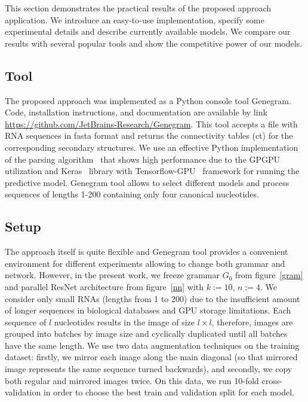 This section demonstrates the practical results of the proposed approach application. We introduce an easy-to-use implementation, specify some experimental details and describe currently available models. We compare our results with several popular tools and show the competitive power of our models.

\subsection{Tool}
The proposed approach was implemented as a Python console tool Genegram. Code, installation instructions, and documentation are available by link \linebreak \url{https://github.com/JetBrains-Research/Genegram}. This tool accepts a file with RNA sequences in fasta format and returns the connectivity tables (ct) for the corresponding secondary structures. We use an effective Python implementation of the parsing algorithm~\cite{Azimov:2018:CPQ:3210259.3210264} that shows high performance due to the GPGPU utilization and Keras~\cite{chollet2015keras} library with Tensorflow-GPU~\cite{tensorflow2015-whitepaper} framework for running the predictive model. Genegram tool allows to select different models and process sequences of lengths 1-200 containing only four canonical nucleotides.

\subsection{Setup}
The approach itself is quite flexible and Genegram tool provides a convenient environment for different experiments allowing to change both grammar and network. However, in the present work, we freeze grammar $G_0$ from figure~\ref{gram} and parallel ResNet architecture from figure~\ref{nn} with $k := 10$, $n := 4$. We consider only small RNAs (lengths from 1 to 200) due to the insufficient amount of longer sequences in biological databases and GPU storage limitations. Each sequence of $l$ nucleotides results in the image of size $l \times l$, therefore, images are grouped into batches by image size and cyclically duplicated until all batches have the same length. We use two data augmentation techniques on the training dataset: firstly, we mirror each image along the main diagonal (so that mirrored image represents the same sequence turned backwards), and secondly, we copy both regular and mirrored images twice. On this data, we run 10-fold cross-validation in order to choose the best train and validation split for each model.

